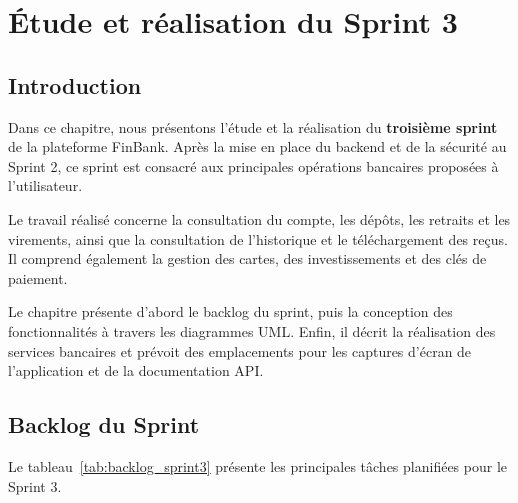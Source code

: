 \chapter{Étude et réalisation du Sprint 3}
\label{chap:sprint3}

\section{Introduction}
\label{sec:intro_sprint3}

Dans ce chapitre, nous présentons l'étude et la réalisation du
\textbf{troisième sprint} de la plateforme FinBank. Après la mise en
place du backend et de la sécurité au Sprint 2, ce sprint est consacré
aux principales opérations bancaires proposées à l'utilisateur.

Le travail réalisé concerne la consultation du compte, les dépôts, les
retraits et les virements, ainsi que la consultation de l'historique et
le téléchargement des reçus. Il comprend également la gestion des
cartes, des investissements et des clés de paiement.

Le chapitre présente d'abord le backlog du sprint, puis la conception
des fonctionnalités à travers les diagrammes UML. Enfin, il décrit la
réalisation des services bancaires et prévoit des emplacements pour les
captures d'écran de l'application et de la documentation API.

\section{Backlog du Sprint}
\label{sec:backlog_sprint3}

Le tableau~\ref{tab:backlog_sprint3} présente les principales tâches
planifiées pour le Sprint 3.

